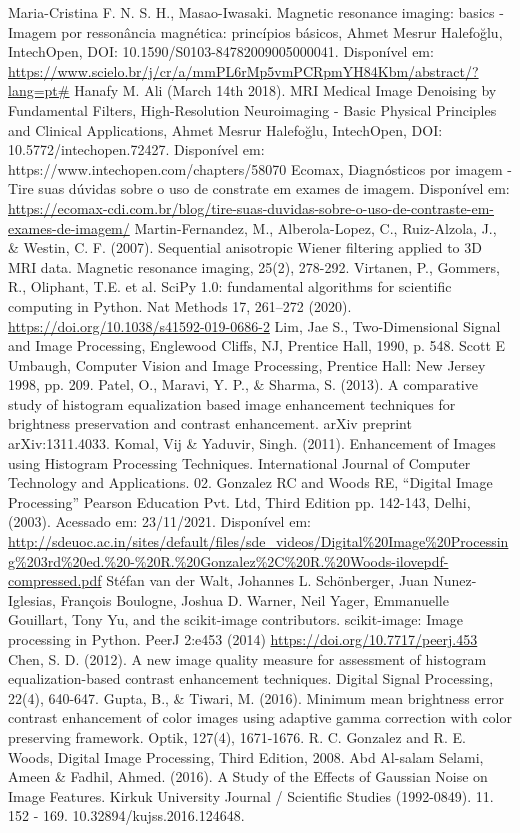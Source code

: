 \documentclass[conference]{IEEEtran}
\begin{document}
\begin{thebibliography}{00}
 Maria-Cristina F. N. S. H., Masao-Iwasaki. Magnetic resonance imaging: basics - Imagem por ressonância magnética: princípios básicos, Ahmet Mesrur Halefoğlu, IntechOpen, DOI: 10.1590/S0103-84782009005000041. Disponível em: \url{https://www.scielo.br/j/cr/a/mmPL6rMp5vmPCRpmYH84Kbm/abstract/?lang=pt#}
 Hanafy M. Ali (March 14th 2018). MRI Medical Image Denoising by Fundamental Filters, High-Resolution Neuroimaging - Basic Physical Principles and Clinical Applications, Ahmet Mesrur Halefoğlu, IntechOpen, DOI: 10.5772/intechopen.72427. Disponível em: https://www.intechopen.com/chapters/58070
 Ecomax, Diagnósticos por imagem - Tire suas dúvidas sobre o uso de constrate em exames de imagem. Disponível em: \url{https://ecomax-cdi.com.br/blog/tire-suas-duvidas-sobre-o-uso-de-contraste-em-exames-de-imagem/}
 Martin-Fernandez, M., Alberola-Lopez, C., Ruiz-Alzola, J., \& Westin, C. F. (2007). Sequential anisotropic Wiener filtering applied to 3D MRI data. Magnetic resonance imaging, 25(2), 278-292.
 Virtanen, P., Gommers, R., Oliphant, T.E. et al. SciPy 1.0: fundamental algorithms for scientific computing in Python. Nat Methods 17, 261–272 (2020). \url{https://doi.org/10.1038/s41592-019-0686-2}
 Lim, Jae S., Two-Dimensional Signal and Image Processing, Englewood Cliffs, NJ, Prentice Hall, 1990, p. 548.
 Scott E Umbaugh, Computer Vision and Image Processing, Prentice Hall: New Jersey 1998, pp. 209.
 Patel, O., Maravi, Y. P., \& Sharma, S. (2013). A comparative study of histogram equalization based image enhancement techniques for brightness preservation and contrast enhancement. arXiv preprint arXiv:1311.4033.
 Komal, Vij \& Yaduvir, Singh. (2011). Enhancement of Images using Histogram Processing Techniques. International Journal of Computer Technology and Applications. 02.
 Gonzalez RC and Woods RE, “Digital Image Processing” Pearson Education Pvt. Ltd, Third Edition pp. 142-143, Delhi, (2003). Acessado em: 23/11/2021. Disponível em: \url{http://sdeuoc.ac.in/sites/default/files/sde_videos/Digital%20Image%20Processing%203rd%20ed.%20-%20R.%20Gonzalez%2C%20R.%20Woods-ilovepdf-compressed.pdf}
 Stéfan van der Walt, Johannes L. Schönberger, Juan Nunez-Iglesias, François Boulogne, Joshua D. Warner, Neil Yager, Emmanuelle Gouillart, Tony Yu, and the scikit-image contributors. scikit-image: Image processing in Python. PeerJ 2:e453 (2014) \url{https://doi.org/10.7717/peerj.453}
 Chen, S. D. (2012). A new image quality measure for assessment of histogram equalization-based contrast enhancement techniques. Digital Signal Processing, 22(4), 640-647.
 Gupta, B., \& Tiwari, M. (2016). Minimum mean brightness error contrast enhancement of color images using adaptive gamma correction with color preserving framework. Optik, 127(4), 1671-1676.
 R. C. Gonzalez and R. E. Woods, Digital Image Processing, Third Edition,
2008.
 Abd Al-salam Selami, Ameen \& Fadhil, Ahmed. (2016). A Study of the Effects of Gaussian Noise on Image Features. Kirkuk University Journal / Scientific Studies (1992-0849). 11. 152 - 169. 10.32894/kujss.2016.124648.
\end{thebibliography}
\vspace{12pt}
\end{document}
